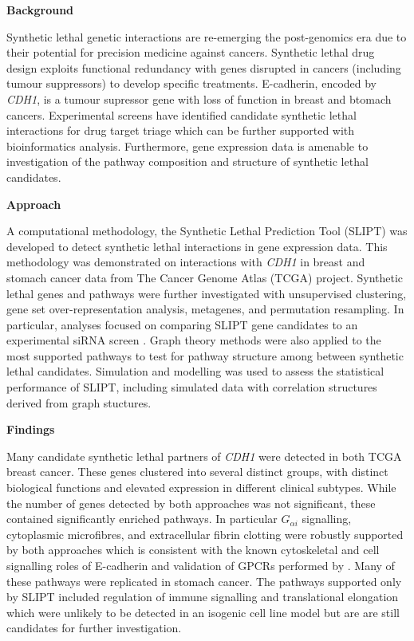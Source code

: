 \textbf{Background}

Synthetic lethal genetic interactions are re-emerging the post-genomics era due to their potential for precision medicine against cancers. Synthetic lethal drug design exploits functional redundancy with genes disrupted in cancers (including tumour suppressors) to develop specific treatments. E-cadherin, encoded by \textit{CDH1}, is a tumour supressor gene with loss of function in breast and btomach cancers. Experimental screens have identified candidate synthetic lethal interactions for drug target triage which can be further supported with bioinformatics analysis. Furthermore, gene expression data is amenable to investigation of the pathway composition and structure of synthetic lethal candidates. 

\textbf{Approach}

A computational methodology, the Synthetic Lethal Prediction Tool (\acrshort{SLIPT}) was developed to detect synthetic lethal interactions in gene expression data. This methodology was demonstrated on interactions with \textit{CDH1} in breast and stomach cancer data from The Cancer Genome Atlas (\acrshort{TCGA}) project. Synthetic lethal genes and pathways were further investigated with unsupervised clustering, gene set over-representation analysis, metagenes, and permutation resampling. In particular, analyses focused on comparing \acrshort{SLIPT} gene candidates to an experimental \acrshort{siRNA} screen \citet{Telford2015}. Graph theory methods were also applied to the most supported pathways to test for pathway structure among between synthetic lethal candidates. Simulation and modelling was used to assess the statistical performance of \acrshort{SLIPT}, including simulated data with correlation structures derived from graph stuctures.

\textbf{Findings}

Many candidate synthetic lethal partners of \textit{CDH1} were detected in both \acrshort{TCGA} breast cancer. These genes clustered into several distinct groups, with distinct biological functions and elevated expression in different clinical subtypes. While the number of genes detected by both approaches was not significant, these contained significantly enriched pathways. In particular $G_{\alpha i}$ signalling, cytoplasmic microfibres, and extracellular fibrin clotting were robustly supported by both approaches which is consistent with the known cytoskeletal and cell signalling roles of E-cadherin and validation of \acrshort{GPCR}s performed by \citet{Telford2015}. Many of these pathways were replicated in stomach cancer. The pathways supported only by \acrshort{SLIPT} included regulation of immune signalling and translational elongation which were unlikely to be detected in an isogenic cell line model but are are still candidates for further investigation. 

